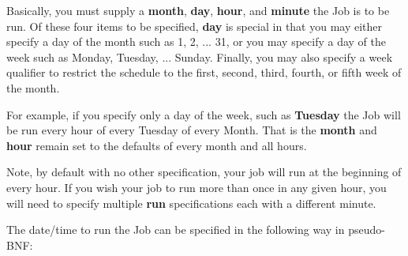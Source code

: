 {Basically, you must supply a {\bf month}, {\bf day}, {\bf hour}, and  {\bf
minute} the Job is to be run. Of these four items to be specified,  {\bf day}
is special in that you may either specify a day of the month  such as 1, 2,
... 31, or you may specify a day of the week such  as Monday, Tuesday, ...
Sunday. Finally, you may also specify a  week qualifier to restrict the
schedule to the first, second, third,  fourth, or fifth week of the month.

For example, if you specify only a day of the week, such as {\bf Tuesday}  the
Job will be run every hour of every Tuesday of every Month. That  is the {\bf
month} and {\bf hour} remain set to the defaults of  every month and all
hours.

Note, by default with no other specification, your job will run  at the
beginning of every hour. If you wish your job to run more than  once in any
given hour, you will need to specify multiple {\bf run}  specifications each
with a different minute.

The date/time to run the Job can be specified in the following way  in
pseudo-BNF:

}
